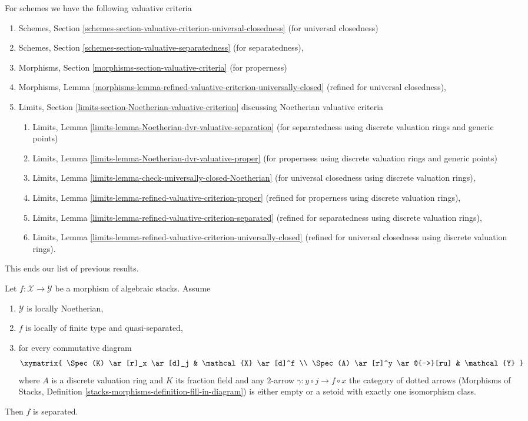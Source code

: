 For schemes we have the following valuative criteria
\begin{enumerate}
\item Schemes, Section
\ref{schemes-section-valuative-criterion-universal-closedness}
(for universal closedness)
\item Schemes, Section \ref{schemes-section-valuative-separatedness}
(for separatedness),
\item Morphisms, Section \ref{morphisms-section-valuative-criteria}
(for properness)
\item Morphisms, Lemma
\ref{morphisms-lemma-refined-valuative-criterion-universally-closed}
(refined for universal closedness),
\item Limits, Section \ref{limits-section-Noetherian-valuative-criterion}
discussing Noetherian valuative criteria
\begin{enumerate}
\item Limits, Lemma \ref{limits-lemma-Noetherian-dvr-valuative-separation}
(for separatedness using discrete valuation rings and generic points)
\item Limits, Lemma \ref{limits-lemma-Noetherian-dvr-valuative-proper}
(for properness using discrete valuation rings and generic points)
\item Limits, Lemma \ref{limits-lemma-check-universally-closed-Noetherian}
(for universal closedness using discrete valuation rings),
\item Limits, Lemma \ref{limits-lemma-refined-valuative-criterion-proper}
(refined for properness using discrete valuation rings),
\item Limits, Lemma \ref{limits-lemma-refined-valuative-criterion-separated}
(refined for separatedness using discrete valuation rings),
\item Limits, Lemma
\ref{limits-lemma-refined-valuative-criterion-universally-closed}
(refined for universal closedness using discrete valuation rings).
\end{enumerate}
\end{enumerate}
This ends our list of previous results.

\begin{lemma}
\label{lemma-check-separated-dvr}
Let $f : \mathcal{X} \to \mathcal{Y}$ be a morphism of algebraic stacks. Assume
\begin{enumerate}
\item $\mathcal{Y}$ is locally Noetherian,
\item $f$ is locally of finite type and quasi-separated,
\item for every commutative diagram
$$
\xymatrix{
\Spec(K) \ar[r]_x \ar[d]_j & \mathcal{X} \ar[d]^f \\
\Spec(A) \ar[r]^y \ar@{-->}[ru] & \mathcal{Y}
}
$$
where $A$ is a discrete valuation ring and $K$ its fraction field
and any $2$-arrow $\gamma : y \circ j \to f \circ x$ the category
of dotted arrows (Morphisms of Stacks, Definition
\ref{stacks-morphisms-definition-fill-in-diagram})
is either empty or a setoid with exactly one isomorphism class.
\end{enumerate}
Then $f$ is separated.
\end{lemma}

